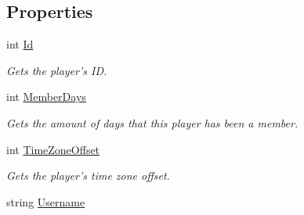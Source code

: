 \subsection*{Properties}
\begin{DoxyCompactItemize}
\item 
\hypertarget{classSharpenguin_1_1Data_1_1Player_a2607a3c888d2a6e67fdf6f3f5a5e75ec}{int \hyperlink{classSharpenguin_1_1Data_1_1Player_a2607a3c888d2a6e67fdf6f3f5a5e75ec}{Id}}\label{classSharpenguin_1_1Data_1_1Player_a2607a3c888d2a6e67fdf6f3f5a5e75ec}

\begin{DoxyCompactList}\small\item\em Gets the player's I\-D. \end{DoxyCompactList}\item 
\hypertarget{classSharpenguin_1_1Data_1_1Player_a7b2814bdcbf34bb2c51f77a43f39cecc}{int \hyperlink{classSharpenguin_1_1Data_1_1Player_a7b2814bdcbf34bb2c51f77a43f39cecc}{Member\-Days}}\label{classSharpenguin_1_1Data_1_1Player_a7b2814bdcbf34bb2c51f77a43f39cecc}

\begin{DoxyCompactList}\small\item\em Gets the amount of days that this player has been a member. \end{DoxyCompactList}\item 
\hypertarget{classSharpenguin_1_1Data_1_1Player_a35b25abceee8791586c924fb5c26829b}{int \hyperlink{classSharpenguin_1_1Data_1_1Player_a35b25abceee8791586c924fb5c26829b}{Time\-Zone\-Offset}}\label{classSharpenguin_1_1Data_1_1Player_a35b25abceee8791586c924fb5c26829b}

\begin{DoxyCompactList}\small\item\em Gets the player's time zone offset. \end{DoxyCompactList}\item 
\hypertarget{classSharpenguin_1_1Data_1_1Player_affeb3814ed1eb1e1649fc7001ef0a001}{string \hyperlink{classSharpenguin_1_1Data_1_1Player_affeb3814ed1eb1e1649fc7001ef0a001}{Username}}\label{classSharpenguin_1_1Data_1_1Player_affeb3814ed1eb1e1649fc7001ef0a001}


\end{DoxyCompactItemize}
